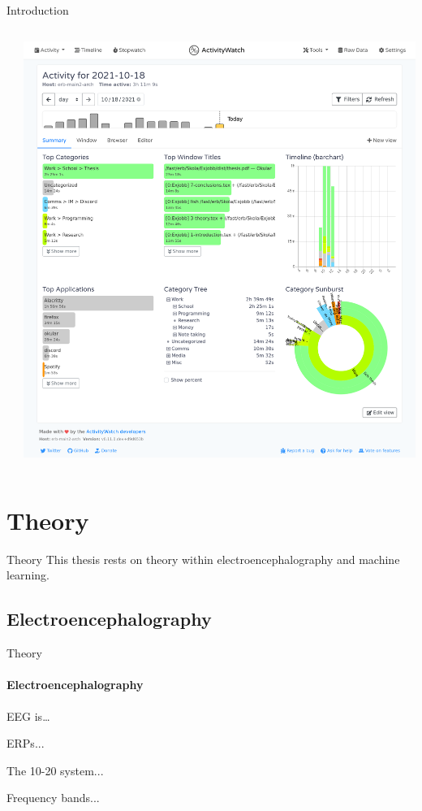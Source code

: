 \documentclass[xcolor={dvipsnames,table},12pt]{beamer}
\newif\ifplacelogo{}  %
\begin{document}
\begin{frame}{Introduction}
\begin{columns}
\begin{column}{0.5\textwidth}
            \vspace{10em}
        \end{column}
        \begin{column}{0.65\textwidth}
            \includegraphics[width=\textwidth]{img/screenshot-aw-activity.png}
        \end{column}
    \end{columns}
\end{frame}
\placelogotrue{}

\section{Theory}
\begin{frame}{Theory}
    This thesis rests on theory within electroencephalography and machine learning.
\end{frame}

\subsection{Electroencephalography}
\begin{frame}{Theory}
    \framesubtitle{Electroencephalography}

    EEG is\ldots

    ERPs...

    The 10-20 system...

    Frequency bands...
\end{frame}
\end{document}

